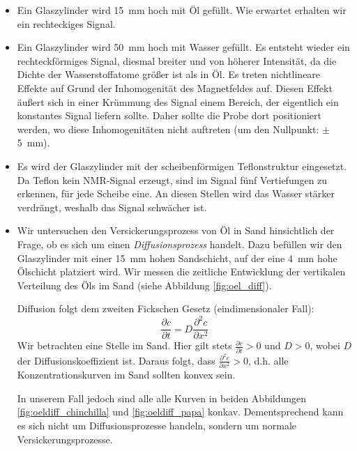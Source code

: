 \documentclass[a4paper]{scrartcl} %
\begin{document}
\begin{itemize}
	\item Ein Glaszylinder wird \SI{15}{mm} hoch mit Öl gefüllt. Wie erwartet erhalten wir ein rechteckiges Signal.
	\item Ein Glaszylinder wird \SI{50}{mm} hoch mit Wasser gefüllt. Es entsteht wieder ein rechteckförmiges Signal, diesmal breiter und von höherer Intensität, da die Dichte der Wasserstoffatome größer ist als in Öl. Es treten nichtlineare Effekte auf Grund der Inhomogenität des Magnetfeldes auf. Diesen Effekt äußert sich in einer Krümmung des Signal einem Bereich, der eigentlich ein konstantes Signal liefern sollte. Daher sollte die Probe dort positioniert werden, wo diese Inhomogenitäten nicht auftreten (um den Nullpunkt: $\pm$ \SI{5}{mm}).
	\item Es wird der Glaszylinder mit der scheibenförmigen Teflonstruktur eingesetzt. Da Teflon kein NMR-Signal erzeugt, sind im Signal fünf Vertiefungen zu erkennen, für jede Scheibe eine. An diesen Stellen wird das Wasser stärker verdrängt, weshalb das Signal schwächer ist.
	\item Wir untersuchen den Versickerungsprozess von Öl in Sand hinsichtlich der Frage, ob es sich um einen \emph{Diffusionsprozess} handelt. Dazu befüllen wir den Glaszylinder mit einer \SI{15}{mm} hohen Sandschicht, auf der eine \SI{4}{mm} hohe Ölschicht platziert wird. Wir messen die zeitliche Entwicklung der vertikalen Verteilung des Öls im Sand (siehe Abbildung \ref{fig:oel_diff}).

	Diffusion folgt dem zweiten Fickschen Gesetz (eindimensionaler Fall):
	\begin{equation}
		\frac{\partial c}{\partial t} = D \frac{\partial^2 c}{\partial x^2}
	\end{equation}
	Wir betrachten eine Stelle im Sand. Hier gilt stets $\tfrac{\partial c}{\partial t} > 0$ und $D > 0$, wobei $D$ der Diffusionskoeffizient ist. Daraus folgt, dass $\tfrac{\partial^2 c}{\partial x^2} > 0$, d.h. alle Konzentrationskurven im Sand sollten konvex sein.

	In unserem Fall jedoch sind alle alle Kurven in beiden Abbildungen \ref{fig:oeldiff_chinchilla} und \ref{fig:oeldiff_papa} konkav. Dementsprechend kann es sich nicht um Diffusionsprozesse handeln, sondern um normale Versickerungsprozesse.
\end{itemize}
\end{document}
